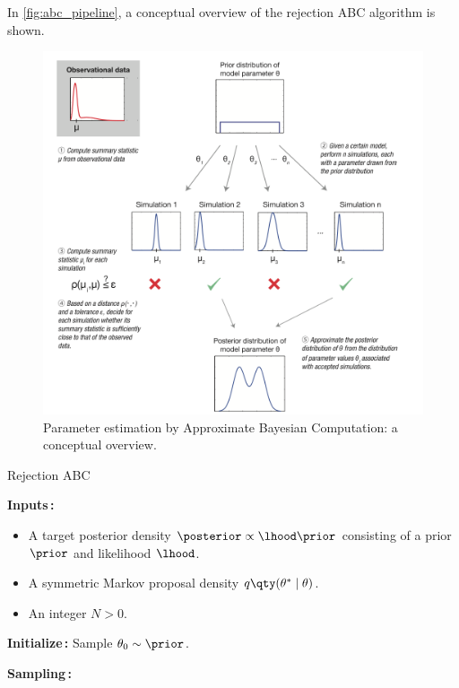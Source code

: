 In \autoref{fig:abc_pipeline}, a conceptual overview of the rejection ABC algorithm is shown. 

\begin{figure}[H]
    \centering 
    \includegraphics[scale=0.7]{./3_Images/abc_pipeline.png}
    \caption{Parameter estimation by Approximate Bayesian Computation: a conceptual overview.}
    \label{fig:abc_pipeline}
\end{figure}


\begin{algorithm}[H]
\caption{Rejection ABC}
\label{alg:mcmcabc}
\SetAlgoLined
\DontPrintSemicolon
 \textbf{Inputs\,:}\;
 \vspace{-5mm}
 \begin{itemize}
     \item A target posterior density $\posterior \propto \lhood \prior$ consisting of a prior $\prior$ and likelihood $\lhood$. 
     \item A symmetric Markov proposal density $q \qty(\theta^* \mid \theta)$.
     \item An integer $N>0$.
 \end{itemize}
 
 \vspace{5mm}
 \textbf{Initialize\,:}\;
 Sample $\theta_0 \sim \prior$.\;

 \vspace{5mm}
 \textbf{Sampling\,:}\;
\end{algorithm}


